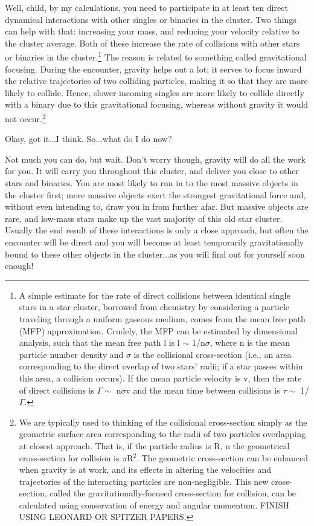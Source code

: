 \documentclass[main.tex]{subfiles}
\begin{document}
\par \Enrico Well, child, by my calculations, you need to participate in at least ten direct dynamical interactions with other singles or binaries in the cluster.  Two things can help with that:  increasing your mass, and reducing your velocity relative to the cluster average.  Both of these increase the rate of collisions with other stars or binaries in the cluster.\footnote{A simple estimate for the rate of direct collisions between identical single stars in a star cluster, borrowed from chemistry by considering a particle traveling through a uniform gaseous medium, comes from the mean free path (MFP) approximation.  Crudely, the MFP can be estimated by dimensional analysis, such that the mean free path l is l $\sim$ 1/n$\sigma$, where n is the mean particle number density and $\sigma$ is the collisional cross-section (i.e., an area corresponding to the direct overlap of two stars' radii; if a star passes within this area, a collision occurs).  If the mean particle velocity is v, then the rate of direct collisions is $\Gamma \sim$ n$\sigma$v and the mean time between collisions is $\tau \sim$ 1/$\Gamma$.}  The reason is related to something called gravitational focusing.  During the encounter, gravity helps out a lot; it serves to focus inward the relative trajectories of two colliding particles, making it so that they are more likely to collide.  Hence, slower incoming singles are more likely to collide directly with a binary due to this gravitational focusing, whereas without gravity it would not occur.\footnote{We are typically used to thinking of the collisional cross-section simply as the geometric surface area corresponding to the radii of two particles overlapping at closest approach.  That is, if the particle radius is R, n the geometrical cross-section for collision is $\pi$R$^2$.  The geometric cross-section can be enhanced when gravity is at work, and its effects in altering the velocities and trajectories of the interacting particles are non-negligible.  This new cross-section, called the gravitationally-focused cross-section for collision, can be calculated using conservation of energy and angular momentum. FINISH USING LEONARD OR SPITZER PAPERS.}

\par \Sterope Okay, got it...I think.  So...what do I do now?

\par \Enrico Not much you can do, but wait.  Don't worry though, gravity will do all the work for you.  It will carry you throughout this cluster, and deliver you close to other stars and binaries.  You are most likely to run in to the most massive objects in the cluster first; more massive objects exert the strongest gravitational force and, without even intending to, draw you in from further afar.  But massive objects are rare, and low-mass stars make up the vast majority of this old star cluster.  Usually the end result of these interactions is only a close approach, but often the encounter will be direct and you will become at least temporarily gravitationally bound to these other objects in the cluster...as you will find out for yourself soon enough!  
\end{document}
